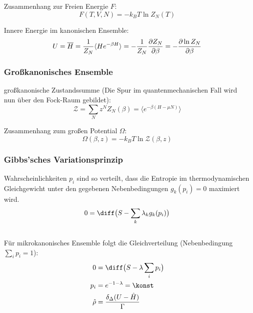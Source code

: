 \documentclass[11pt]{article}
\numberwithin{equation}{section}
\begin{document}
        Zusammenhang zur Freien Energie $F$:
        \begin{equation}
          F(T, V, N) = -k_B T \ln{Z_N(T)}
        \end{equation}


        Innere Energie im kanonischen Ensemble:
        \begin{equation}
          U = \overline{H} = \frac{1}{Z_N}\langle He^{-\beta H}\rangle = -\frac{1}{Z_N}\frac{\partial Z_N}{\partial \beta} = -\frac{\partial \ln Z_N}{\partial \beta}
        \end{equation}

      \subsubsection{Großkanonisches Ensemble}
        großkanonische Zustandssumme (Die Spur im quantenmechanischen Fall wird nun über den Fock-Raum gebildet):
        \begin{equation}
          \mathcal{Z} = \sum_N z^N Z_N(\beta) = \langle e^{-\beta(H-\mu N)} \rangle
        \end{equation}

        Zusammenhang zum großen Potential $\Omega$:
        \begin{equation}
          \Omega(\beta,z) = -k_B T \ln \mathcal{Z}(\beta,z)
        \end{equation}


      \subsubsection{Gibbs'sches Variationsprinzip}
        Wahrscheinlichkeiten $p_i$ sind so verteilt, dass die Entropie im thermodynamischen Gleichgewicht unter den gegebenen Nebenbedingungen $g_k(p_i) = 0$ maximiert wird.
        \begin{equation}
          0 = \diff \big( S - \sum_k \lambda_k g_k(p_i) \big)
        \end{equation}\\

        Für mikrokanonisches Ensemble folgt die Gleichverteilung (Nebenbedingung $\sum_i p_i = 1$):
        \begin{equation}
          \begin{aligned}
            0 &= \diff \big( S - \lambda \sum_i p_i \big) \\
            p_i &= e^{-1-\lambda} = \konst \\
            \hat{\rho} &= \frac{\delta_\Delta(U-\hat{H})}{\Gamma} \\
          \end{aligned}
        \end{equation}
\end{document}
